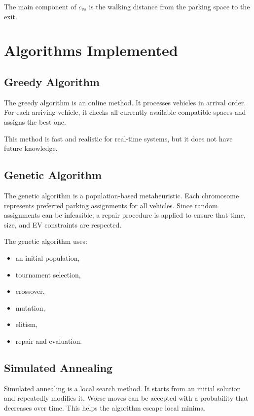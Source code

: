 \documentclass[12pt,a4paper]{article}
\begin{document}
The main component of $c_{vs}$ is the walking distance from the parking space to the exit.

\section{Algorithms Implemented}

\subsection{Greedy Algorithm}

The greedy algorithm is an online method. It processes vehicles in arrival order. For each arriving vehicle, it checks all currently available compatible spaces and assigns the best one.

This method is fast and realistic for real-time systems, but it does not have future knowledge.

\subsection{Genetic Algorithm}

The genetic algorithm is a population-based metaheuristic. Each chromosome represents preferred parking assignments for all vehicles. Since random assignments can be infeasible, a repair procedure is applied to ensure that time, size, and EV constraints are respected.

The genetic algorithm uses:

\begin{itemize}
    \item an initial population,
    \item tournament selection,
    \item crossover,
    \item mutation,
    \item elitism,
    \item repair and evaluation.
\end{itemize}

\subsection{Simulated Annealing}

Simulated annealing is a local search method. It starts from an initial solution and repeatedly modifies it. Worse moves can be accepted with a probability that decreases over time. This helps the algorithm escape local minima.
\end{document}
